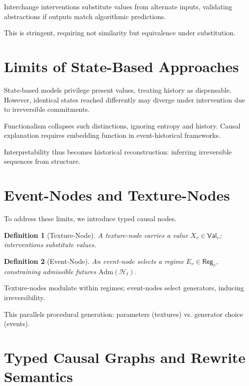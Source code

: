 \documentclass[11pt]{article}
\newtheorem{definition}{Definition}
\theoremstyle{remark}
\newcommand{\Adm}{\mathrm{Adm}}
\newcommand{\Hist}{\mathcal{H}}
\newcommand{\Val}{\mathsf{Val}}
\newcommand{\Reg}{\mathsf{Reg}}
\begin{document}
Interchange interventions substitute values from alternate inputs, validating abstractions if outputs match algorithmic predictions.

This is stringent, requiring not similarity but equivalence under substitution.

\section{Limits of State-Based Approaches}

State-based models privilege present values, treating history as dispensable. However, identical states reached differently may diverge under intervention due to irreversible commitments.

Functionalism collapses such distinctions, ignoring entropy and history. Causal explanation requires embedding function in event-historical frameworks.

Interpretability thus becomes historical reconstruction: inferring irreversible sequences from structure.

\section{Event-Nodes and Texture-Nodes}

To address these limits, we introduce typed causal nodes.

\begin{definition}[Texture-Node]
A texture-node carries a value $X_v \in \Val_v$; interventions substitute values.
\end{definition}

\begin{definition}[Event-Node]
An event-node selects a regime $E_v \in \Reg_v$, constraining admissible futures $\Adm(\Hist_t)$.
\end{definition}

Texture-nodes modulate within regimes; event-nodes select generators, inducing irreversibility.

This parallels procedural generation: parameters (textures) vs. generator choice (events).

\section{Typed Causal Graphs and Rewrite Semantics}
\end{document}
